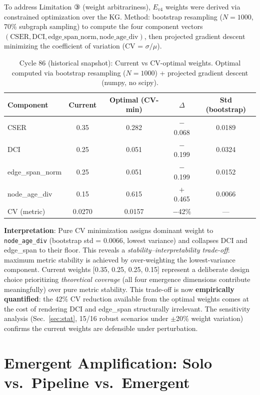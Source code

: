 \documentclass[12pt]{article}
\begin{document}
To address Limitation ③ (weight arbitrariness), $E_{v4}$ weights were derived
via constrained optimization over the KG. Method: bootstrap resampling
($N=1000$, 70\% subgraph sampling) to compute the four component vectors
$(\text{CSER}, \text{DCI}, \text{edge\_span\_norm}, \text{node\_age\_div})$,
then projected gradient descent minimizing the coefficient of variation (CV = $\sigma/\mu$).

\begin{table}[h!]\centering\small
\begin{tabular}{lcccc}
\toprule
Component & Current & Optimal (CV-min) & $\Delta$ & Std (bootstrap) \\
\midrule
CSER & 0.35 & 0.282 & $-$0.068 & 0.0189 \\
DCI & 0.25 & 0.051 & $-$0.199 & 0.0324 \\
edge\_span\_norm & 0.25 & 0.051 & $-$0.199 & 0.0152 \\
node\_age\_div & 0.15 & 0.615 & $+$0.465 & 0.0066 \\
\midrule
CV (metric) & 0.0270 & 0.0157 & $-$42\% & --- \\
\bottomrule
\end{tabular}
\caption{Cycle 86 (historical snapshot): Current vs CV-optimal weights. Optimal computed via bootstrap
resampling ($N=1000$) + projected gradient descent (numpy, no scipy).}
\end{table}

\textbf{Interpretation}: Pure CV minimization assigns dominant weight to
\texttt{node\_age\_div} (bootstrap std = 0.0066, lowest variance) and collapses DCI
and edge\_span to their floor. This reveals a \emph{stability--interpretability
trade-off}: maximum metric stability is achieved by over-weighting the lowest-variance
component. Current weights [0.35, 0.25, 0.25, 0.15] represent a deliberate design
choice prioritizing \emph{theoretical coverage} (all four emergence dimensions
contribute meaningfully) over pure metric stability. This trade-off is now
\textbf{empirically quantified}: the 42\% CV reduction available from the optimal
weights comes at the cost of rendering DCI and edge\_span structurally irrelevant.
The sensitivity analysis (Sec.~\ref{sec:stat}, 15/16 robust scenarios under $\pm$20\%
weight variation) confirms the current weights are defensible under perturbation.

\section{Emergent Amplification: Solo vs.\ Pipeline vs.\ Emergent}
\label{sec:amplification}
\end{document}
